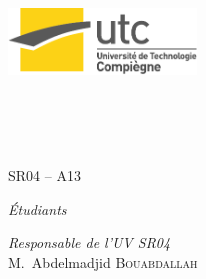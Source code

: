 \begin{center}


\includegraphics [width=50mm]{logo-utc.pdf} \\[3cm]

\HRule \\[0.2cm]
\begin{spacing}{1.4}
{\huge \bfseries \reporttitle}\\[0.2cm]
\end{spacing}
\HRule \\[0.5cm]
\textsc{\Large SR04 -- A13}\\[2.0cm]

\begin{minipage}[t]{0.3\textwidth}
  \begin{flushleft} \large
    \emph{Étudiants} \\
    \reportauthor
  \end{flushleft}
\end{minipage}
\begin{minipage}[t]{0.6\textwidth}
  \begin{flushright} \large
    \emph{Responsable de l'UV SR04} \\
    M.~Abdelmadjid \textsc{Bouabdallah} \\
  \end{flushright}
\end{minipage}

\vfill

\end{center}
  \cleardoublepage %